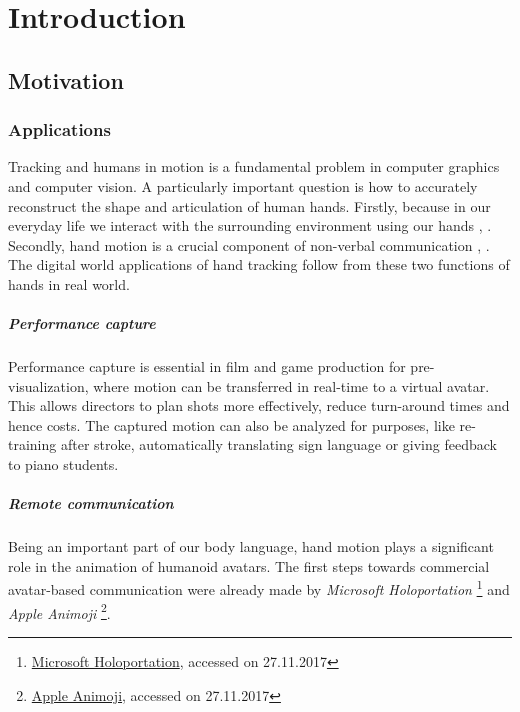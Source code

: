 \chapter{Introduction}

\section{Motivation}

\subsection*{Applications}

Tracking and humans in motion is a fundamental problem in computer graphics and computer vision. A particularly important question is how to accurately reconstruct the shape and articulation of human hands. Firstly, because in our everyday life we interact with the surrounding environment using our hands \cite{bullock2013hand}, \cite{dollar2014classifying}. Secondly, hand motion is a crucial component of non-verbal communication \cite{goman2009nonverbal}, \cite{goman2011silent}. The digital world applications of hand tracking follow from these two functions of hands in real world.

\paragraph{Performance capture} Performance capture is essential in film and game production for pre-visualization, where motion can be transferred in real-time to a virtual avatar. This allows directors to plan shots more effectively, reduce turn-around times and hence costs. The captured motion can also be analyzed for purposes, like re-training after stroke, automatically translating sign language or giving feedback to piano students.

\paragraph{Remote communication} Being an important part of our body language, hand motion  plays a significant role in the animation of humanoid avatars. The first steps towards commercial avatar-based communication were already made by 
%
\textit{Microsoft Holoportation}
\footnote{\href{https://www.microsoft.com/en-us/research/project/holoportation-3/}{Microsoft Holoportation}, accessed on 27.11.2017}
%
and \textit{Apple Animoji} 
\footnote{\href{https://support.apple.com/en-us/HT208190}{Apple Animoji}, accessed on 27.11.2017}.

